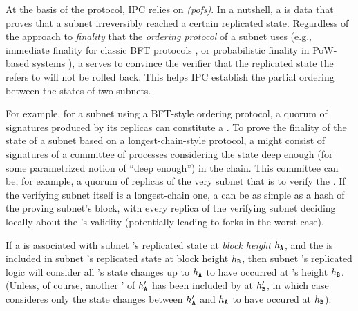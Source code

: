 At the basis of the protocol, IPC relies on  \emph{\pofsFull (\glspl{pof})}.
In a nutshell, a \pof is data that proves that a subnet irreversibly reached a certain replicated state.
Regardless of the approach to \emph{\gls{finality}} that the  \emph{ordering protocol} of a subnet uses (e.g., immediate finality for classic BFT protocols \cite{Algorand}, or probabilistic finality in PoW-based systems \cite{nakamoto2008bitcoin}),
a \pof serves to convince the verifier that the replicated state the \pof refers to will not be rolled back. This helps IPC establish the partial ordering between the states of two subnets. 


For example, for a subnet using a BFT-style ordering protocol, a quorum of signatures produced by its replicas can constitute a \pof.
To prove the finality of the state of a subnet based on a longest-chain-style protocol,
a \pof might consist of signatures of a committee of processes considering the state deep enough (for some parametrized notion of ``deep enough'') in the chain.
This committee can be, for example, a quorum of replicas of the very subnet that is to verify the \pof.
If the verifying subnet itself is a longest-chain one, a \pof can be as simple as a hash of the proving subnet's block,
with every replica of the verifying subnet deciding locally about the \pof's validity (potentially leading to forks in the worst case).

If a \pof is associated with subnet 's replicated state at \emph{\gls{block height}} $h_{\textbf{\texttt{A}}}$,
and the \pof is included in subnet 's replicated state at block height $h_{\textbf{\texttt{B}}}$,
then subnet 's replicated logic will consider all 's state changes up to $h_{\textbf{\texttt{A}}}$
to have occurred at 's height $h_{\textbf{\texttt{B}}}$.
(Unless, of course, another \pof' of $h'_{\textbf{\texttt{A}}}$ has been included by  at $h'_{\textbf{\texttt{B}}}$,
in which case  consideres only the state changes between $h'_{\textbf{\texttt{A}}}$ and $h_{\textbf{\texttt{A}}}$ to have occured at $h_{\textbf{\texttt{B}}}$).

